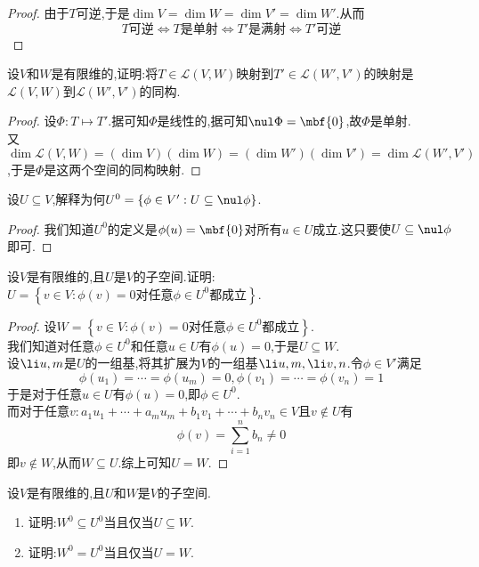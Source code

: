 \documentclass{ctexart}
\begin{document}
\begin{proof}
    由于$T$可逆,于是$\dim V=\dim W=\dim V'=\dim W'$.从而
    $$T\text{可逆}\Leftrightarrow T\text{是单射}\Leftrightarrow T'\text{是满射}\Leftrightarrow T'\text{可逆}$$
\end{proof}
\begin{problem}[18.]
    设$V$和$W$是有限维的,证明:将$T\in\mathcal{L}(V,W)$映射到$T'\in\mathcal{L}(W',V')$的映射是$\mathcal{L}(V,W)$到$\mathcal{L}(W',V')$的同构.
\end{problem}
\begin{proof}
    设$\Phi:T\mapsto T'$.据可知$\Phi$是线性的,据可知$\nul\Phi=\mbf{0}$,故$\Phi$是单射.\\
    又$\dim\mathcal{L}(V,W)=(\dim V)(\dim W)=(\dim W')(\dim V')=\dim\mathcal{L}(W',V')$,于是$\Phi$是这两个空间的同构映射.
\end{proof}
\begin{problem}[19.]
    设$U\subseteq V$,解释为何$U^0=\left\{\phi\in V':U\subseteq\nul\phi\right\}$.
\end{problem}
\begin{proof}
    我们知道$U^0$的定义是$\phi(u)=\mbf{0}$对所有$u\in U$成立.这只要使$U\subseteq\nul\phi$即可.
\end{proof}
\begin{problem}[20.]
    设$V$是有限维的,且$U$是$V$的子空间.证明:$U=\left\{v\in V:\phi(v)=0\text{对任意}\phi\in U^0\text{都成立}\right\}$.
\end{problem}
\begin{proof}
    设$W=\left\{v\in V:\phi(v)=0\text{对任意}\phi\in U^0\text{都成立}\right\}$.\\
    我们知道对任意$\phi\in U^0$和任意$u\in U$有$\phi(u)=0$,于是$U\subseteq W$.\\
    设$\li u,m$是$U$的一组基,将其扩展为$V$的一组基$\li u,m,\li v,n$.令$\phi\in V'$满足
    $$\phi(u_1)=\cdots=\phi(u_m)=0,\phi(v_1)=\cdots=\phi(v_n)=1$$
    于是对于任意$u\in U$有$\phi(u)=0$,即$\phi\in U^0$.\\
    而对于任意$v:a_1u_1+\cdots+a_mu_m+b_1v_1+\cdots+b_nv_n\in V$且$v\notin U$有
    $$\phi(v)=\sum_{i=1}^{n}b_n\neq 0$$
    即$v\notin W$,从而$W\subseteq U$.综上可知$U=W$.
\end{proof}
\begin{problem}[21.]
    设$V$是有限维的,且$U$和$W$是$V$的子空间.
    \begin{enumerate}[label=\tbf{(\arabic*)}]
        \item 证明:$W^0\subseteq U^0$当且仅当$U\subseteq W$.
        \item 证明:$W^0=U^0$当且仅当$U=W$.
    \end{enumerate}
\end{problem}
\end{document}
